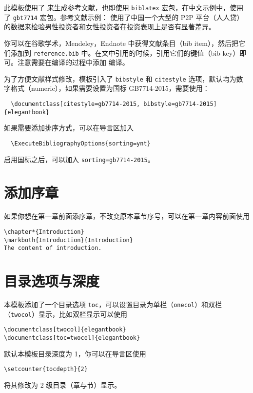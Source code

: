 \documentclass[cn,10pt,math=newtx,citestyle=gb7714-2015,bibstyle=gb7714-2015]{elegantbook}
\begin{document}
此模板使用了  来生成参考文献，也即使用 \lstinline{biblatex} 宏包，在中文示例中，使用了 \lstinline{gbt7714} 宏包。参考文献示例：\cite{cn1,en2,en3} 使用了中国一个大型的 P2P 平台（人人贷）的数据来检验男性投资者和女性投资者在投资表现上是否有显著差异。

你可以在谷歌学术，Mendeley，Endnote 中获得文献条目（bib item），然后把它们添加到 \lstinline{reference.bib} 中。在文中引用的时候，引用它们的键值（bib key）即可。注意需要在编译的过程中添加  编译。

为了方便文献样式修改，模板引入了 \lstinline{bibstyle} 和 \lstinline{citestyle} 选项，默认均为数字格式（numeric），如果需要设置为国标 GB7714-2015，需要使用：
\begin{lstlisting}
  \documentclass[citestyle=gb7714-2015, bibstyle=gb7714-2015]{elegantbook} 
\end{lstlisting}

如果需要添加排序方式，可以在导言区加入
\begin{lstlisting}
  \ExecuteBibliographyOptions{sorting=ynt}
\end{lstlisting}

启用国标之后，可以加入 \lstinline{sorting=gb7714-2015}。

\section{添加序章}

如果你想在第一章前面添序章，不改变原本章节序号，可以在第一章内容前面使用 
\begin{lstlisting}
\chapter*{Introduction}
\markboth{Introduction}{Introduction}
The content of introduction.
\end{lstlisting}

\section{目录选项与深度}
本模板添加了一个目录选项 \lstinline{toc}，可以设置目录为单栏（\lstinline{onecol}）和双栏（\lstinline{twocol}）显示，比如双栏显示可以使用
\begin{lstlisting}
\documentclass[twocol]{elegantbook}
\documentclass[toc=twocol]{elegantbook}
\end{lstlisting}

默认本模板目录深度为 1，你可以在导言区使用
\begin{lstlisting}
\setcounter{tocdepth}{2}
\end{lstlisting}
将其修改为 2 级目录（章与节）显示。
\end{document}

